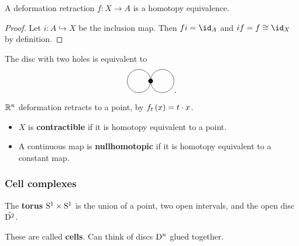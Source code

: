 \begin{lemma}
A deformation retraction $ f : X \to A $ is a homotopy equivalence.
\end{lemma}

\begin{proof}
Let $ i : A \hookrightarrow X $ be the inclusion map. Then $ fi = \id_A $ and $ if = f \cong \id_X $ by definition.
\end{proof}

\begin{example*}
The disc with two holes is equivalent to
$$
\begin{tikzpicture}
\fill (0, 0) circle (0.1);
\draw (-0.5, 0) circle (0.5);
\draw (0.5, 0) circle (0.5);
\end{tikzpicture}.
$$
\end{example*}

\begin{example*}
$ \RR^n $ deformation retracts to a point, by $ f_t\br{x} = t \cdot x $.
\end{example*}

\begin{definition*}
\hfill
\begin{itemize}
\item $ X $ is \textbf{contractible} if it is homotopy equivalent to a point.
\item A continuous map is \textbf{nullhomotopic} if it is homotopy equivalent to a constant map.
\end{itemize}
\end{definition*}

\subsubsection{Cell complexes}

\begin{example*}
The \textbf{torus} $ \S^1 \times \S^1 $ is the union of a point, two open intervals, and the open disc $ \mathring{\D^2} $.
\end{example*}

These are called \textbf{cells}. Can think of discs $ \D^n $ glued together.


